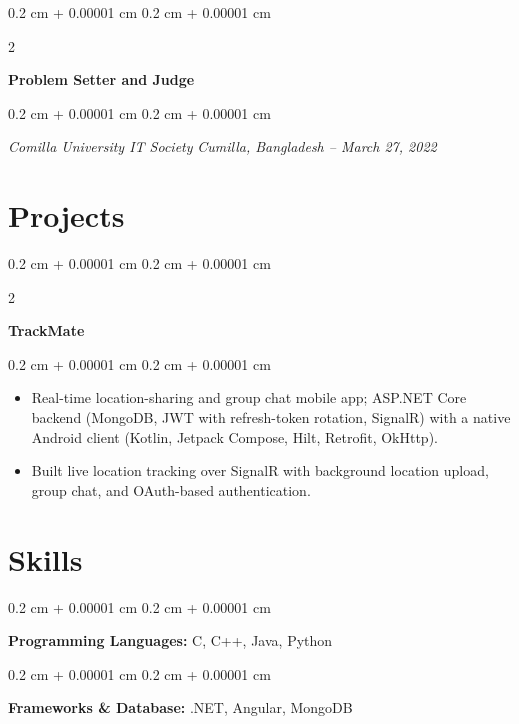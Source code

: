 \documentclass[10pt, letterpaper]{article}
\newenvironment{highlights}{
    \begin{itemize}[
        topsep=0.10 cm,
        parsep=0.10 cm,
        partopsep=0pt,
        itemsep=0pt,
        leftmargin=0.4 cm + 10pt
    ]
}{
    \end{itemize}
} %
\newenvironment{onecolentry}{
    \begin{adjustwidth}{
        0.2 cm + 0.00001 cm
    }{
        0.2 cm + 0.00001 cm
    }
}{
    \end{adjustwidth}
} %
\newenvironment{twocolentry}[2][]{
    \onecolentry
    \def\secondColumn{#2}
    \setcolumnwidth{\fill, 4.5 cm}
    \begin{paracol}{2}
}{
    \switchcolumn \raggedleft \secondColumn
    \end{paracol}
    \endonecolentry
} %
\begin{document}
        \begin{twocolentry}{}
            \textbf{Problem Setter and Judge}
        \end{twocolentry}

        \vspace{0.10 cm}
        \begin{onecolentry}
            \textit{Comilla University IT Society} \hfill \textit{Cumilla, Bangladesh -- March 27, 2022}
        \end{onecolentry}

    \section{Projects}

        \begin{twocolentry}{}
            \textbf{TrackMate}
        \end{twocolentry}

        \vspace{0.10 cm}
        \begin{onecolentry}
            \begin{highlights}
                \item Real-time location-sharing and group chat mobile app; ASP.NET Core backend (MongoDB, JWT with refresh-token rotation, SignalR) with a native Android client (Kotlin, Jetpack Compose, Hilt, Retrofit, OkHttp).
                \item Built live location tracking over SignalR with background location upload, group chat, and OAuth-based authentication.
            \end{highlights}
        \end{onecolentry}

    \section{Skills}

        \begin{onecolentry}
            \textbf{Programming Languages:} C, C++, Java, Python
        \end{onecolentry}

        \vspace{0.2 cm}

        \begin{onecolentry}
            \textbf{Frameworks \& Database:} .NET, Angular, MongoDB
        \end{onecolentry}
\end{document}
